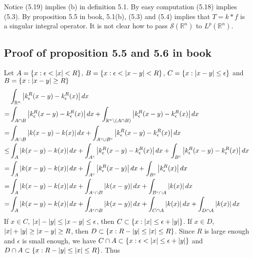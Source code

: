 \begin{remark} 
    Notice (5.19) implies (b) in definition 5.1. By easy computation (5.18) implies (5.3). By proposition 5.5 in book,
    5.1(b), (5.3) and (5.4) implies that $T=k*f$ is a singular integral operator. {\color{blue}It is not clear how to pass $\mathscr{S}(\mathbb{R}^n)$ to $L^p(\mathbb{R}^n)$}.\par

\end{remark}
\subsection{Proof of proposition 5.5 and 5.6 in book}
\begin{remark}
    Let $A=\{x:\epsilon<\left\lvert x\right\rvert<R\}$, $B=\{x:\epsilon<\left\lvert x-y\right\rvert<R\}$, $C=\{x:\left\lvert x-y\right\rvert\leq\epsilon\}$ and $B=\{x:\left\lvert x-y\right\rvert\geq R\}$
    \begin{align*}
             & \int_{\mathbb{R}^n}\left\lvert k_\epsilon^R(x-y)-k_\epsilon^R(x)\right\rvert dx                                                                            \\
        =    & \int_{A\cap B}\left\lvert k_\epsilon^R(x-y)-k_\epsilon^R(x)\right\rvert dx+\int_{\mathbb{R}^n\setminus (A\cap B)}\left\lvert k_\epsilon^R(x-y)-k_\epsilon^R(x)\right\rvert dx \\
        =    & \int_{A\cap B}\left\lvert k(x-y)-k(x)\right\rvert dx+\int_{A^c\cup B^c}\left\lvert k_\epsilon^R(x-y)-k_\epsilon^R(x)\right\rvert dx                                           \\
        \leq & \int_{A}\left\lvert k(x-y)-k(x)\right\rvert dx+\int_{A^c}\left\lvert k_\epsilon^R(x-y)-k_\epsilon^R(x)\right\rvert dx  +\int_{B^c}\left\lvert k_\epsilon^R(x-y)-k_\epsilon^R(x)\right\rvert dx   \\
        =    & \int_{A}\left\lvert k(x-y)-k(x)\right\rvert dx+\int_{A^c}\left\lvert k_\epsilon^R(x-y)\right\rvert dx  +\int_{B^c}\left\lvert k_\epsilon^R(x)\right\rvert dx                                     \\
        =    & \int_{A}\left\lvert k(x-y)-k(x)\right\rvert dx+\int_{A^c\cap B}\left\lvert k(x-y)\right\rvert dx  +\int_{B^c\cap A}\left\lvert k(x)\right\rvert dx                                               \\
        =    & \int_{A}\left\lvert k(x-y)-k(x)\right\rvert dx+\int_{A^c\cap B}\left\lvert k(x-y)\right\rvert dx  +\int_{C\cap A}\left\lvert k(x)\right\rvert dx+\int_{D\cap A}\left\lvert k(x)\right\rvert dx
    \end{align*}
    If $x\in C$, $\left\lvert x\right\rvert-\left\lvert y\right\rvert\leq\left\lvert x-y\right\rvert\leq\epsilon$,  then $C\subset \{x:\left\lvert x\right\rvert\leq \epsilon+\left\lvert y\right\rvert\}$. If $x\in D$, $\left\lvert x\right\rvert+\left\lvert y\right\rvert\geq\left\lvert x-y\right\rvert\geq R$,  then $D\subset \{x:R-\left\lvert y\right\rvert\leq\left\lvert x\right\rvert\leq R\}$. Since $R$ is large enough and $\epsilon$ is small enough, we have  $C\cap A\subset \{x:\epsilon<\left\lvert x\right\rvert\leq\epsilon+\left\lvert y\right\rvert\}$ and $D\cap A\subset \{x:R-\left\lvert y\right\rvert\leq\left\lvert x\right\rvert\leq R\}$. Thus

\end{remark}
